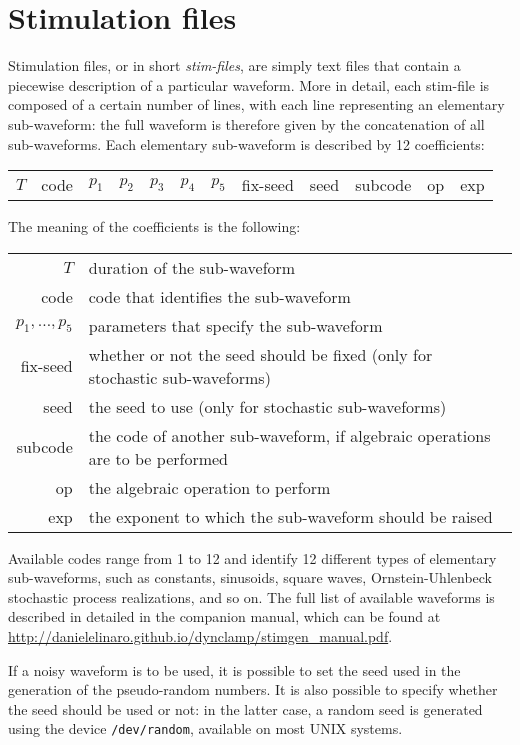 \section{Stimulation files}
Stimulation files, or in short \textit{stim-files}, are simply text
files that contain a piecewise description of a particular
waveform. More in detail, each stim-file is composed of a certain
number of lines, with each line representing an elementary
sub-waveform: the full waveform is therefore given by the
concatenation of all sub-waveforms. Each elementary sub-waveform is
described by 12 coefficients:
\begin{table}[h!!]
\centering
\begin{tabular}{cccccccccccc}
$T$ & code & $p_1$ & $p_2$ & $p_3$ & $p_4$ & $p_5$ & fix-seed & seed &
subcode & op & exp
\end{tabular}
\label{tab:subwav}
\end{table}

The meaning of the coefficients is the following:
\begin{table}[h!!]
\begin{tabular}{r|l}
$T$ & duration of the sub-waveform \\
code & code that identifies the sub-waveform \\
$p_1, \ldots, p_5$ & parameters that specify the sub-waveform \\
fix-seed & whether or not the seed should be fixed (only for
stochastic sub-waveforms) \\
seed & the seed to use (only for stochastic sub-waveforms) \\
subcode & the code of another sub-waveform, if algebraic operations
are to be performed \\
op & the algebraic operation to perform \\
exp & the exponent to which the sub-waveform should be raised
\end{tabular}
\label{tab:params}
\end{table}

Available codes range from 1 to 12 and identify 12 different types of
elementary sub-waveforms, such as constants, sinusoids, square waves,
Ornstein-Uhlenbeck stochastic process realizations, and so on. The
full list of available waveforms is described in detailed in the
companion manual, which can be found at
\url{http://danielelinaro.github.io/dynclamp/stimgen_manual.pdf}.

If a noisy waveform is to be used, it is possible to set the seed used
in the generation of the pseudo-random numbers. It is also possible to
specify whether the seed should be used or not: in the latter case, a
random seed is generated using the device \verb+/dev/random+,
available on most UNIX systems.

